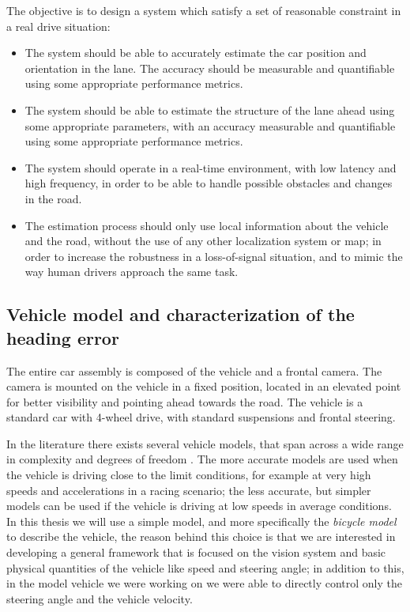 \documentclass[a4paper,12pt,sort&compress]{article}
\begin{document}
    The objective is to design a system which satisfy a set of reasonable
    constraint in a real drive situation:
    \begin{itemize}
        \item The system should be able to accurately estimate the car position and
            orientation in the lane. The accuracy should be measurable and
            quantifiable using some appropriate performance metrics.
        \item The system should be able to estimate the structure of the lane
            ahead using some appropriate parameters, with an accuracy measurable
            and quantifiable using some appropriate performance metrics.
        \item The system should operate in a real-time environment, with low
            latency and high frequency, in order to be able to handle possible
            obstacles and changes in the road.
        \item The estimation process should only use local information about the
            vehicle and the road, without the use of any other localization system
            or map; in order to increase the robustness in a loss-of-signal
            situation, and to mimic the way human drivers approach the same
            task.
    \end{itemize}

\subsection{Vehicle model and characterization of the heading error}
    The entire car assembly is composed of the vehicle and a frontal camera. The
    camera is mounted on the vehicle in a fixed position, located in an elevated
    point for better visibility and pointing ahead towards the road. The vehicle
    is a standard car with 4-wheel drive, with standard suspensions and frontal
    steering.

    In the literature there exists several vehicle models, that span across a
    wide range in complexity and degrees of freedom \citep{doi:10.1080/00423119508969086}. The more accurate
    models are used when the vehicle is driving close to the limit conditions,
    for example at very high speeds and accelerations in a racing scenario; the
    less accurate, but simpler models can be used if the vehicle is driving at
    low speeds in average conditions. In this thesis we will use a simple model,
    and more specifically the \textit{bicycle model} \citep{7995816} to describe the vehicle,
    the reason behind this choice is that we are interested in developing a
    general framework that is focused on the vision system and basic physical
    quantities of the vehicle like speed and steering angle; in addition to
    this, in the model vehicle we were working on we were able to directly
    control only the steering angle and the vehicle velocity. 
\end{document}
